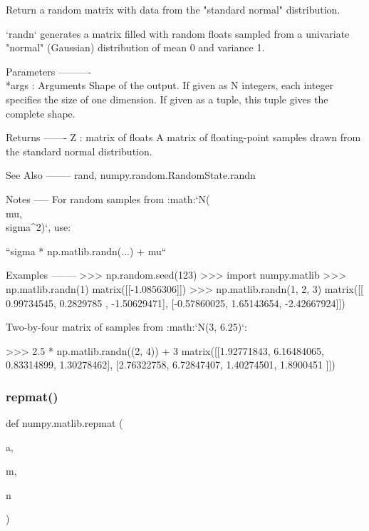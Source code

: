 \begin{DoxyVerb}Return a random matrix with data from the "standard normal" distribution.

`randn` generates a matrix filled with random floats sampled from a
univariate "normal" (Gaussian) distribution of mean 0 and variance 1.

Parameters
----------
\\*args : Arguments
    Shape of the output.
    If given as N integers, each integer specifies the size of one
    dimension. If given as a tuple, this tuple gives the complete shape.

Returns
-------
Z : matrix of floats
    A matrix of floating-point samples drawn from the standard normal
    distribution.

See Also
--------
rand, numpy.random.RandomState.randn

Notes
-----
For random samples from :math:`N(\\mu, \\sigma^2)`, use:

``sigma * np.matlib.randn(...) + mu``

Examples
--------
>>> np.random.seed(123)
>>> import numpy.matlib
>>> np.matlib.randn(1)
matrix([[-1.0856306]])
>>> np.matlib.randn(1, 2, 3)
matrix([[ 0.99734545,  0.2829785 , -1.50629471],
        [-0.57860025,  1.65143654, -2.42667924]])

Two-by-four matrix of samples from :math:`N(3, 6.25)`:

>>> 2.5 * np.matlib.randn((2, 4)) + 3
matrix([[1.92771843, 6.16484065, 0.83314899, 1.30278462],
        [2.76322758, 6.72847407, 1.40274501, 1.8900451 ]])\end{DoxyVerb}
 \mbox{\label{namespacenumpy_1_1matlib_af5303554e156055733afe9e3cd7535ae}} 
\subsubsection{\texorpdfstring{repmat()}{repmat()}}
{\footnotesize\ttfamily def numpy.\+matlib.\+repmat (\begin{DoxyParamCaption}\item[{}]{a,  }\item[{}]{m,  }\item[{}]{n }\end{DoxyParamCaption})}

